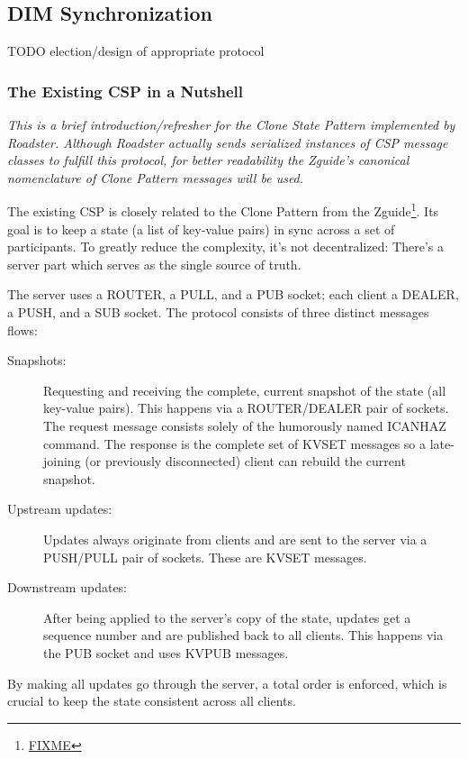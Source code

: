 \subsection{DIM Synchronization}
TODO election/design of appropriate protocol\\

\subsubsection{The Existing CSP in a Nutshell}
\emph{This is a brief introduction/refresher for the Clone State Pattern
implemented by Roadster. Although Roadster actually sends serialized instances
of CSP message classes to fulfill this protocol, for better readability the
Zguide's canonical nomenclature of Clone Pattern messages will be used.}

The existing CSP is closely related to the Clone Pattern from the Zguide\footnote{\url{FIXME}}. Its
goal is to keep a state (a list of key-value pairs) in sync across a set of
participants. To greatly reduce the complexity, it's not decentralized: There's
a server part which serves as the single source of truth.

The server uses a ROUTER, a PULL, and a PUB socket; each client a DEALER, a
PUSH, and a SUB socket. The protocol consists of three distinct messages flows:

\begin{description}
	\item [Snapshots:]
		Requesting and receiving the complete, current snapshot of the
		state (all key-value pairs). This happens via a
		ROUTER/DEALER pair of sockets. The request message consists solely of
		the humorously named ICANHAZ command. The response is the
		complete set of KVSET messages so a late-joining (or previously
		disconnected) client can rebuild the current snapshot.

	\item [Upstream updates:]
		Updates always originate from clients and are sent to the
		server via a PUSH/PULL pair of sockets. These are KVSET messages.

	\item [Downstream updates:]
		After being applied to the server's copy of the state,
		updates get a sequence number and are published back to all
		clients. This happens via the PUB socket and
		uses KVPUB messages.
\end{description}

By making all updates go through the server, a total order is enforced,
which is crucial to keep the state consistent across all clients.

